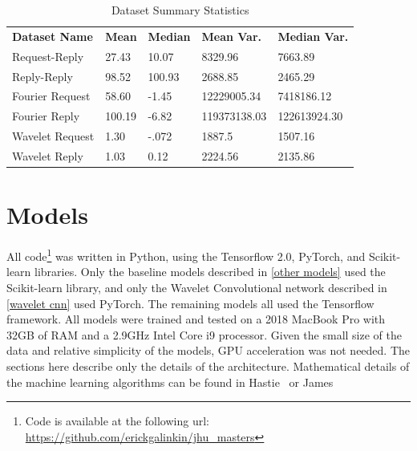 \documentclass[10pt]{article}
\begin{document}
\renewcommand{\thefootnote}{*} 
\begin{table}[h]
\caption{Dataset Summary Statistics}
\centering
\label{Tab:summary}	
\begin{tabular}{l|llll}
\textbf{Dataset Name} & \textbf{Mean} & \textbf{Median} & \textbf{Mean Var.} & \textbf{Median Var.} \\\cline{1-5}
Request-Reply         & 27.43    & 10.07    & 8329.96    & 7663.89 \\
Reply-Reply           & 98.52    & 100.93   & 2688.85    & 2465.29 \\
Fourier Request       & 58.60\footnotemark    & -1.45    & 12229005.34    & 7418186.12 \\
Fourier Reply         & 100.19\footnotemark    & -6.82    & 119373138.03    & 122613924.30 \\
Wavelet Request       & 1.30    & -.072    & 1887.5    & 1507.16 \\
Wavelet Reply         & 1.03    & 0.12    & 2224.56    & 2135.86                 
\end{tabular}
\end{table}

\renewcommand{\thefootnote}{1}

\section{Models}
All code\footnote{Code is available at the following url: \url{https://github.com/erickgalinkin/jhu_masters}} was written in Python, using the Tensorflow 2.0, PyTorch, and Scikit-learn libraries.
Only the baseline models described in \ref{other models} used the Scikit-learn library, and only the Wavelet Convolutional network described in \ref{wavelet cnn} used PyTorch.
The remaining models all used the Tensorflow framework.
All models were trained and tested on a 2018 MacBook Pro with 32GB of RAM and a 2.9GHz Intel Core i9 processor.
Given the small size of the data and relative simplicity of the models, GPU acceleration was not needed.
The sections here describe only the details of the architecture.
Mathematical details of the machine learning algorithms can be found in Hastie~\cite{hastie01statisticallearning} or James~\cite{james14introduction}
\end{document}
